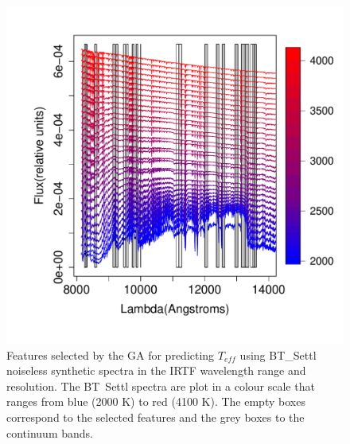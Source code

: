 \begin {figure}
 \centering
  \includegraphics[scale=0.55]{figs/BT-spectraAtIRTF-Inf-teff}
  \caption{Features selected by the GA for predicting $T_{eff}$ using
    BT\_Settl noiseless synthetic spectra in the IRTF wavelength range
    and resolution. The BT\ Settl spectra are plot in a colour scale
    that ranges from blue (2000 K) to red (4100 K). The empty boxes
    correspond to the selected features and the grey boxes to the
    continuum bands.}
\label{fig:irtf-teff-inf}
\end {figure}


